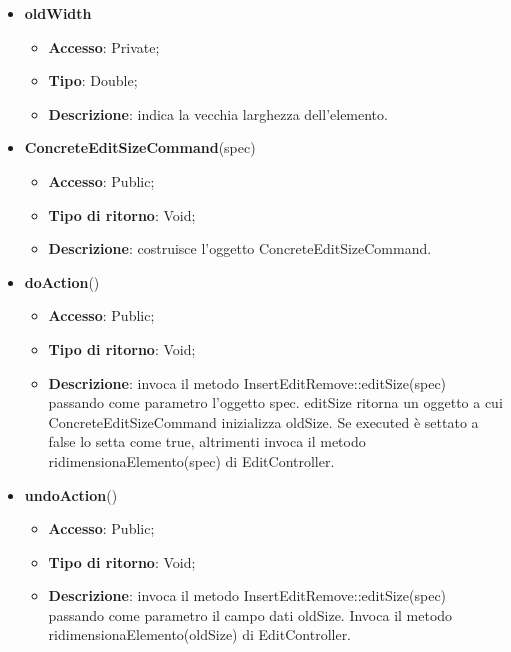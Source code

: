 {{{\begin{itemize}
\begin{itemize}
\begin{itemize}
\begin{itemize}
				\end{itemize}
				\item \textbf{oldWidth}
				\begin{itemize}
					\item \textbf{Accesso}: Private;
					\item \textbf{Tipo}: Double;
					\item \textbf{Descrizione}: indica la vecchia larghezza dell’elemento.
				\end{itemize}
			\end{itemize}
				\end{itemize}
				\end{itemize}
			\begin{itemize}
				\item \textbf{ConcreteEditSizeCommand}(spec)
				\begin{itemize}
					\item \textbf{Accesso}: Public;
					\item \textbf{Tipo di ritorno}: Void;
					\item \textbf{Descrizione}: costruisce l’oggetto ConcreteEditSizeCommand.
				\end{itemize}
				\item \textbf{doAction}()
				\begin{itemize}
					\item \textbf{Accesso}: Public;
					\item \textbf{Tipo di ritorno}: Void;
					\item \textbf{Descrizione}: invoca il metodo InsertEditRemove::editSize(spec) passando come parametro l'oggetto spec. editSize ritorna un oggetto a cui ConcreteEditSizeCommand inizializza oldSize. Se executed è settato a false lo setta come true, altrimenti invoca il metodo ridimensionaElemento(spec) di EditController.
				\end{itemize}
				\item \textbf{undoAction}()
				\begin{itemize}
					\item \textbf{Accesso}: Public;
					\item \textbf{Tipo di ritorno}: Void;
					\item \textbf{Descrizione}: invoca il metodo InsertEditRemove::editSize(spec) passando come parametro il campo dati oldSize. Invoca il metodo ridimensionaElemento(oldSize) di EditController.
				\end{itemize}
			\end{itemize}
			}

}}
